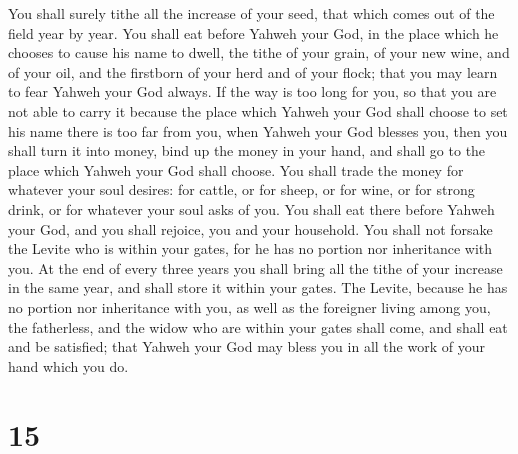  You shall surely tithe all the increase of your seed,
that which comes out of the field year by year.  You
shall eat before Yahweh your God, in the place which he chooses to cause
his name to dwell, the tithe of your grain, of your new wine, and of
your oil, and the firstborn of your herd and of your flock; that you may
learn to fear Yahweh your God always.  If the way is too
long for you, so that you are not able to carry it because the place
which Yahweh your God shall choose to set his name there is too far from
you, when Yahweh your God blesses you,  then you shall
turn it into money, bind up the money in your hand, and shall go to the
place which Yahweh your God shall choose.  You shall
trade the money for whatever your soul desires: for cattle, or for
sheep, or for wine, or for strong drink, or for whatever your soul asks
of you. You shall eat there before Yahweh your God, and you shall
rejoice, you and your household.  You shall not forsake
the Levite who is within your gates, for he has no portion nor
inheritance with you.  At the end of every three years
you shall bring all the tithe of your increase in the same year, and
shall store it within your gates.  The Levite, because he
has no portion nor inheritance with you, as well as the foreigner living
among you, the fatherless, and the widow who are within your gates shall
come, and shall eat and be satisfied; that Yahweh your God may bless you
in all the work of your hand which you do.

\hypertarget{section-14}{%
\section{15}\label{section-14}}

